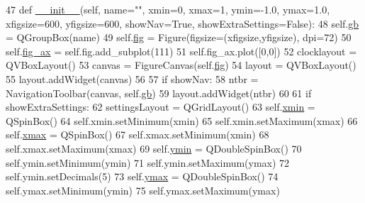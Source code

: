 \begin{DoxyCode}
47     \textcolor{keyword}{def }\hyperlink{classsoftware_1_1chipwhisperer_1_1common_1_1ui_1_1pysidegraph_1_1pysideGraph_a49bafadc7983523cb1b5554a5c02a3f7}{\_\_init\_\_}(self, name="", xmin=0, xmax=1, ymin=-1.0, ymax=1.0, xfigsize=600, yfigsize=600, 
      showNav=True, showExtraSettings=False):
48         self.\hyperlink{classsoftware_1_1chipwhisperer_1_1common_1_1ui_1_1pysidegraph_1_1pysideGraph_a3aefaa9cc2b430096de491cc9475f4de}{gb} = QGroupBox(name)
49         self.\hyperlink{classsoftware_1_1chipwhisperer_1_1common_1_1ui_1_1pysidegraph_1_1pysideGraph_a8c80cf98e638975dd3cde3d1e46c344d}{fig} = Figure(figsize=(xfigsize,yfigsize), dpi=72)
50         self.\hyperlink{classsoftware_1_1chipwhisperer_1_1common_1_1ui_1_1pysidegraph_1_1pysideGraph_ae4a11a1c7dad8512f87e7c9ebffabb46}{fig\_ax} =  self.fig.add\_subplot(111)
51         self.fig\_ax.plot([0,0])
52         clocklayout = QVBoxLayout()
53         canvas = FigureCanvas(self.\hyperlink{classsoftware_1_1chipwhisperer_1_1common_1_1ui_1_1pysidegraph_1_1pysideGraph_a8c80cf98e638975dd3cde3d1e46c344d}{fig})
54         layout = QVBoxLayout()
55         layout.addWidget(canvas)
56 
57         \textcolor{keywordflow}{if} showNav:
58             ntbr = NavigationToolbar(canvas, self.\hyperlink{classsoftware_1_1chipwhisperer_1_1common_1_1ui_1_1pysidegraph_1_1pysideGraph_a3aefaa9cc2b430096de491cc9475f4de}{gb})
59             layout.addWidget(ntbr)
60 
61         \textcolor{keywordflow}{if} showExtraSettings:
62             settingsLayout = QGridLayout()
63             self.\hyperlink{classsoftware_1_1chipwhisperer_1_1common_1_1ui_1_1pysidegraph_1_1pysideGraph_affbe2e3bea77d4b0cd32f2d9be71bbd1}{xmin} = QSpinBox()
64             self.xmin.setMinimum(xmin)
65             self.xmin.setMaximum(xmax)
66             self.\hyperlink{classsoftware_1_1chipwhisperer_1_1common_1_1ui_1_1pysidegraph_1_1pysideGraph_ac3a7736676c107cf00d620ea1a81501c}{xmax} = QSpinBox()
67             self.xmax.setMinimum(xmin)
68             self.xmax.setMaximum(xmax)
69             self.\hyperlink{classsoftware_1_1chipwhisperer_1_1common_1_1ui_1_1pysidegraph_1_1pysideGraph_aa375bd6e4a50393a64c9f1a6e9938cbb}{ymin} = QDoubleSpinBox()
70             self.ymin.setMinimum(ymin)
71             self.ymin.setMaximum(ymax)
72             self.ymin.setDecimals(5)
73             self.\hyperlink{classsoftware_1_1chipwhisperer_1_1common_1_1ui_1_1pysidegraph_1_1pysideGraph_a00fdd1c1b1bc39b2aa614a75d0179f13}{ymax} = QDoubleSpinBox()
74             self.ymax.setMinimum(ymin)
75             self.ymax.setMaximum(ymax)

\end{DoxyCode}
